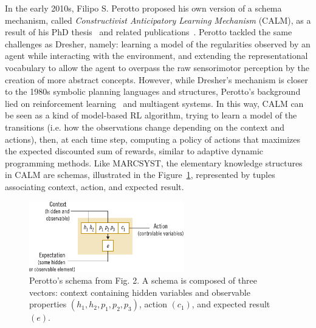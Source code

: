 \documentclass[runningheads]{llncs}
\begin{document}
In the early 2010s, Filipo S. Perotto proposed his own version of a schema mechanism, called \textit{Constructivist Anticipatory Learning Mechanism} (CALM), as a result of his PhD thesis~\cite{Perotto:2010:UFRGS,Perotto:2010:INP} and related publications~\cite{Perotto:2013:CF,Perotto:2006:SGAI,Perotto:2006:AAMAS,Perotto:2007:EpiRob}.
Perotto tackled the same challenges as Dresher, namely: learning a model of the regularities observed by an agent while interacting with the environment, and extending the representational vocabulary to allow the agent to overpass the raw sensorimotor perception by the creation of more abstract concepts.
However, while Dresher's mechanism is closer to the 1980s symbolic planning languages and structures, Perotto's background lied on reinforcement learning~\cite{Sutton:2018} and multiagent systems.
In this way, CALM can be seen as a kind of model-based RL algorithm, trying to learn a model of the transitions (i.e. how the observations change depending on the context and actions), then, at each time step, computing a policy of actions that maximizes the expected discounted sum of rewards, similar to adaptive dynamic programming methods.
Like MARCSYST, the elementary knowledge structures in CALM are schemas, illustrated in the Figure~\ref{fig:perotto_schema}, represented by tuples associating context, action, and expected result.

\begin{figure}
	\centering
	\includegraphics[width=0.6\textwidth]{Figure_4_CALM_schema.pdf}
	\caption{Perotto's schema from \cite{Perotto:2013:CF} Fig. 2.
		A schema is composed of three vectors: context containing hidden variables and observable properties $(h_1, h_2, p_1, p_2, p_3)$, action $(c_1)$, and expected result $(e)$. } 
	\label{fig:perotto_schema}
\end{figure}
\end{document}
